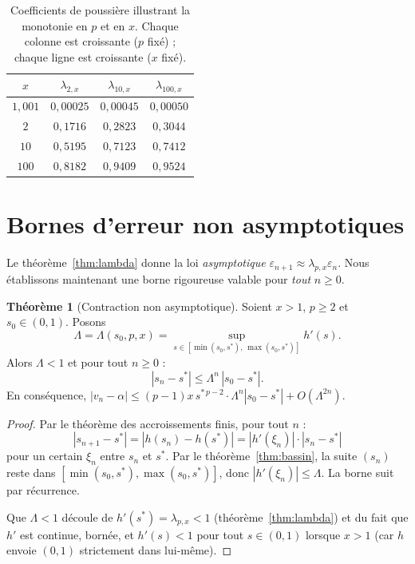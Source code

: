 \documentclass[11pt,a4paper]{article}
\theoremstyle{definition}
\newtheorem{theorem}{Théorème}[section]
\newcommand{\eps}{\varepsilon}
\begin{document}
\begin{table}[h]
\centering
\begin{tabular}{cccc}
\toprule
$x$ & $\lambda_{2,x}$ & $\lambda_{10,x}$ & $\lambda_{100,x}$ \\
\midrule
$1{,}001$ & $0{,}00025$ & $0{,}00045$ & $0{,}00050$ \\
$2$ & $0{,}1716$ & $0{,}2823$ & $0{,}3044$ \\
$10$ & $0{,}5195$ & $0{,}7123$ & $0{,}7412$ \\
$100$ & $0{,}8182$ & $0{,}9409$ & $0{,}9524$ \\
\bottomrule
\end{tabular}
\caption{Coefficients de poussière illustrant la monotonie en $p$ et en $x$. Chaque colonne est croissante ($p$ fixé) ; chaque ligne est croissante ($x$ fixé).}
\end{table}

\section{Bornes d'erreur non asymptotiques}
\label{sec:nonasymptotic}

Le théorème~\ref{thm:lambda} donne la loi \emph{asymptotique} $\eps_{n+1} \approx \lambda_{p,x} \eps_n$. Nous établissons maintenant une borne rigoureuse valable pour \emph{tout} $n \geq 0$.

\begin{theorem}[Contraction non asymptotique]
\label{thm:nonasymp}
Soient $x > 1$, $p \geq 2$ et $s_0 \in (0,1)$. Posons
\[
  \Lambda = \Lambda(s_0, p, x) = \sup_{s \in [\min(s_0, s^*),\, \max(s_0, s^*)]} h'(s).
\]
Alors $\Lambda < 1$ et pour tout $n \geq 0$ :
\begin{equation}
  \label{eq:nonasymp_bound}
  |s_n - s^*| \leq \Lambda^n \, |s_0 - s^*|.
\end{equation}
En conséquence, $|v_n - \alpha| \leq (p-1) x\, s^{*\,p-2} \cdot \Lambda^n |s_0 - s^*| + O(\Lambda^{2n})$.
\end{theorem}

\begin{proof}
Par le théorème des accroissements finis, pour tout $n$ :
\[
  |s_{n+1} - s^*| = |h(s_n) - h(s^*)| = |h'(\xi_n)| \cdot |s_n - s^*|
\]
pour un certain $\xi_n$ entre $s_n$ et $s^*$. Par le théorème~\ref{thm:bassin}, la suite $(s_n)$ reste dans $[\min(s_0,s^*), \max(s_0,s^*)]$, donc $|h'(\xi_n)| \leq \Lambda$. La borne suit par récurrence.

Que $\Lambda < 1$ découle de $h'(s^*) = \lambda_{p,x} < 1$ (théorème~\ref{thm:lambda}) et du fait que $h'$ est continue, bornée, et $h'(s) < 1$ pour tout $s \in (0,1)$ lorsque $x > 1$ (car $h$ envoie $(0,1)$ strictement dans lui-même).
\end{proof}
\end{document}

